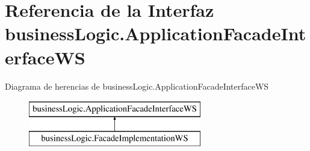 \hypertarget{interfacebusiness_logic_1_1_application_facade_interface_w_s}{}\section{Referencia de la Interfaz business\+Logic.\+Application\+Facade\+Interface\+WS}
\label{interfacebusiness_logic_1_1_application_facade_interface_w_s}
Diagrama de herencias de business\+Logic.\+Application\+Facade\+Interface\+WS\begin{figure}[H]
\begin{center}
\leavevmode
\includegraphics[height=2.000000cm]{interfacebusiness_logic_1_1_application_facade_interface_w_s}
\end{center}
\end{figure}
